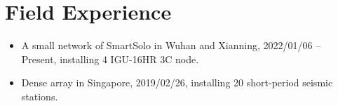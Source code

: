 \section{Field Experience}
\begin{itemize}
\item A small network of SmartSolo in Wuhan and Xianning,
      2022/01/06 -- Present, installing 4 IGU-16HR 3C node.
\item Dense array in Singapore,
      2019/02/26, installing 20 short-period seismic stations.
\end{itemize}
